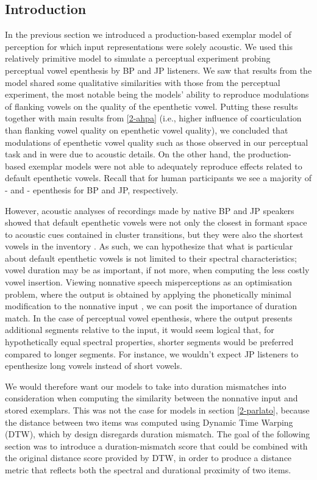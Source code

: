 \subsection{Introduction}
In the previous section we introduced a production-based exemplar model of perception for which input representations were solely acoustic. We used this relatively primitive model to simulate a perceptual experiment probing perceptual vowel epenthesis by BP and JP listeners. We saw that results from the model shared some qualitative similarities with those from the perceptual experiment, the most notable being the models' ability to reproduce modulations of flanking vowels on the quality of the epenthetic vowel. Putting these results together with main results from \ref{2-ahpa} (i.e., higher influence of coarticulation than flanking vowel quality on epenthetic vowel quality), we concluded that modulations of epenthetic vowel quality such as those observed in our perceptual task and in \cite{dupoux2011} were due to acoustic details.
On the other hand, the production-based exemplar models were not able to adequately reproduce effects related to default epenthetic vowels. Recall that for human participants we see a majority of - and - epenthesis for BP and JP, respectively.

However, acoustic analyses of recordings made by native BP and JP speakers showed that default epenthetic vowels were not only the closest in formant space to acoustic cues contained in cluster transitions, but they were also the shortest vowels in the inventory . As such, we can hypothesize that what is particular about default epenthetic vowels is not limited to their spectral characteristics; vowel duration may be as important, if not more, when computing the less costly vowel insertion. Viewing nonnative speech misperceptions as an optimisation problem, where the output is obtained by applying the phonetically minimal modification to the nonnative input \cite{peperkamp2003, dupoux2011, steriade2001}, we can posit the importance of duration match. In the case of perceptual vowel epenthesis, where the output presents additional segments relative to the input, it would seem logical that, for hypothetically equal spectral properties, shorter segments would be preferred compared to longer segments. For instance, we wouldn't expect JP listeners to epenthesize long vowels instead of short vowels.

We would therefore want our models to take into duration mismatches into consideration when computing the similarity between the nonnative input and stored exemplars. This was not the case for models in section \ref{2-parlato}, because the distance between two items was computed using Dynamic Time Warping (DTW), which by design disregards duration mismatch. The goal of the following section was to introduce a duration-mismatch score that could be combined with the original distance score provided by DTW, in order to produce a distance metric that reflects both the spectral and durational proximity of two items.

